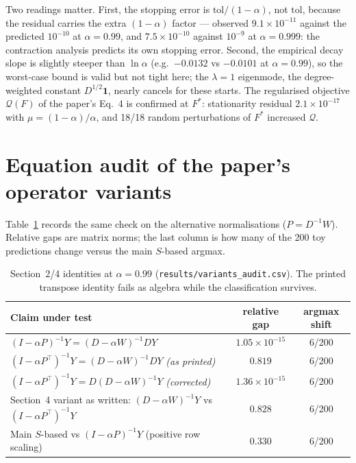 \noindent
Two readings matter.
First, the stopping error is $\mathrm{tol}/(1-\alpha)$, not $\mathrm{tol}$, because
the residual carries the extra $(1-\alpha)$ factor --- observed
$9.1\times10^{-11}$ against the predicted $10^{-10}$ at $\alpha=0.99$, and
$7.5\times10^{-10}$ against $10^{-9}$ at $\alpha=0.999$: the contraction analysis
predicts its own stopping error. Second, the empirical decay slope is slightly
steeper than $\ln\alpha$ (e.g.\ $-0.0132$ vs $-0.0101$ at $\alpha=0.99$), so the
worst-case bound is valid but not tight here; the $\lambda=1$ eigenmode, the
degree-weighted constant $D^{1/2}\mathbf{1}$, nearly cancels for these starts.
The regularised objective $\mathcal{Q}(F)$ of the paper's Eq.~4 is confirmed at
$F^{*}$: stationarity residual $2.1\times10^{-17}$ with $\mu=(1-\alpha)/\alpha$,
and 18/18 random perturbations of $F^{*}$ increased $\mathcal{Q}$.

\section{Equation audit of the paper's operator variants}\label{app:variants}

Table~\ref{tab:variants} records the same check on the alternative normalisations
($P=D^{-1}W$). Relative gaps are matrix norms; the last column is how many of the
200 toy predictions change versus the main $S$-based argmax.

\begin{table}[h]\centering\small
\caption{Section~2/4 identities at $\alpha=0.99$ (\texttt{results/variants\_audit.csv}).
The printed transpose identity fails as algebra while the classification survives.}
\label{tab:variants}
\begin{tabular}{lcc}
\toprule
Claim under test & relative gap & argmax shift \\
\midrule
$(I-\alpha P)^{-1}Y=(D-\alpha W)^{-1}DY$ & $1.05\times10^{-15}$ & 6/200 \\
$(I-\alpha P^{\top})^{-1}Y=(D-\alpha W)^{-1}DY$ \emph{(as printed)} & $0.819$ & 6/200 \\
$(I-\alpha P^{\top})^{-1}Y=D(D-\alpha W)^{-1}Y$ \emph{(corrected)} & $1.36\times10^{-15}$ & 6/200 \\
Section~4 variant as written: $(D-\alpha W)^{-1}Y$ vs $(I-\alpha P^{\top})^{-1}Y$ & $0.828$ & 6/200 \\
Main $S$-based vs $(I-\alpha P)^{-1}Y$ (positive row scaling) & $0.330$ & 6/200 \\
\bottomrule
\end{tabular}
\end{table}

